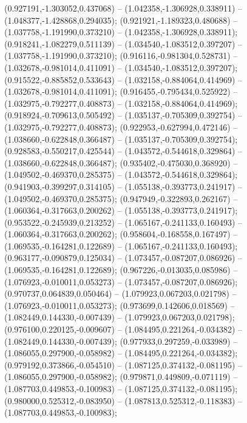  (0.927191,-1.303052,0.437068) -- (1.042358,-1.306928,0.338911) -- (1.048377,-1.428868,0.294035);
 (0.921921,-1.189323,0.480688) -- (1.037758,-1.191990,0.373210) -- (1.042358,-1.306928,0.338911);
 (0.918241,-1.082279,0.511139) -- (1.034540,-1.083512,0.397207) -- (1.037758,-1.191990,0.373210);
 (0.916116,-0.981304,0.528731) -- (1.032678,-0.981014,0.411091) -- (1.034540,-1.083512,0.397207);
 (0.915522,-0.885852,0.533643) -- (1.032158,-0.884064,0.414969) -- (1.032678,-0.981014,0.411091);
 (0.916455,-0.795434,0.525922) -- (1.032975,-0.792277,0.408873) -- (1.032158,-0.884064,0.414969);
 (0.918924,-0.709613,0.505492) -- (1.035137,-0.705309,0.392754) -- (1.032975,-0.792277,0.408873);
 (0.922953,-0.627994,0.472146) -- (1.038660,-0.622848,0.366487) -- (1.035137,-0.705309,0.392754);
 (0.928583,-0.550217,0.425544) -- (1.043572,-0.544618,0.329864) -- (1.038660,-0.622848,0.366487);
 (0.935402,-0.475030,0.368920) -- (1.049502,-0.469370,0.285375) -- (1.043572,-0.544618,0.329864);
 (0.941903,-0.399297,0.314105) -- (1.055138,-0.393773,0.241917) -- (1.049502,-0.469370,0.285375);
 (0.947949,-0.322893,0.262167) -- (1.060364,-0.317663,0.200262) -- (1.055138,-0.393773,0.241917);
 (0.953522,-0.245939,0.213252) -- (1.065167,-0.241133,0.160493) -- (1.060364,-0.317663,0.200262);
 (0.958604,-0.168558,0.167497) -- (1.069535,-0.164281,0.122689) -- (1.065167,-0.241133,0.160493);
 (0.963177,-0.090879,0.125034) -- (1.073457,-0.087207,0.086926) -- (1.069535,-0.164281,0.122689);
 (0.967226,-0.013035,0.085986) -- (1.076923,-0.010011,0.053273) -- (1.073457,-0.087207,0.086926);
 (0.970737,0.064839,0.050464) -- (1.079923,0.067203,0.021798) -- (1.076923,-0.010011,0.053273);
 (0.973699,0.142606,0.018569) -- (1.082449,0.144330,-0.007439) -- (1.079923,0.067203,0.021798);
 (0.976100,0.220125,-0.009607) -- (1.084495,0.221264,-0.034382) -- (1.082449,0.144330,-0.007439);
 (0.977933,0.297259,-0.033989) -- (1.086055,0.297900,-0.058982) -- (1.084495,0.221264,-0.034382);
 (0.979192,0.373866,-0.054510) -- (1.087125,0.374132,-0.081195) -- (1.086055,0.297900,-0.058982);
 (0.979871,0.449809,-0.071119) -- (1.087703,0.449853,-0.100983) -- (1.087125,0.374132,-0.081195);
 (0.980000,0.525312,-0.083950) -- (1.087813,0.525312,-0.118383) -- (1.087703,0.449853,-0.100983);

